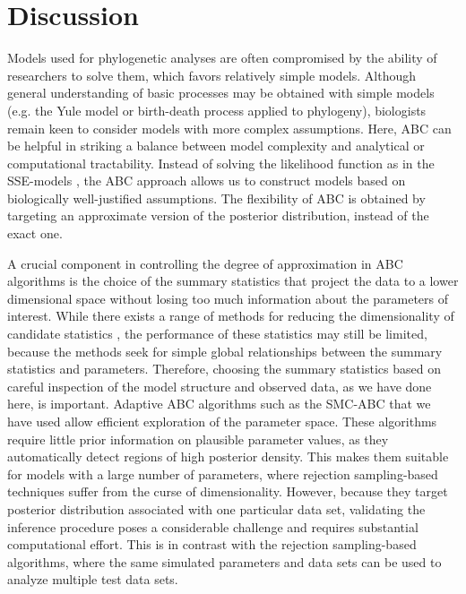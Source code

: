\section*{Discussion}
\noindent Models used for phylogenetic analyses are often compromised by the ability of researchers to solve them, which favors relatively simple models. 
Although general understanding of basic processes may be obtained with simple models (e.g. the Yule model \citep{Yule1924} or birth-death process applied to phylogeny), biologists remain keen to consider models with more complex assumptions. 
Here, ABC can be helpful in striking a balance between model complexity and analytical or computational tractability. 
Instead of solving the likelihood function as in the SSE-models \citep{Maddison2007, Goldberg2011, FitzJohn2012}, the ABC approach allows us to construct models based on biologically well-justified assumptions. 
The flexibility of ABC is obtained by targeting an approximate version of the posterior distribution, instead of the exact one. 

A crucial component in controlling the degree of approximation in ABC algorithms is the choice of the summary statistics that project the data to a lower dimensional space without losing too much information about the parameters of interest. 
While there exists a range of methods for reducing the dimensionality of candidate statistics \citep{Blum2013}, the performance of these statistics may still be limited, because the methods seek for simple global relationships between the summary statistics and parameters. 
Therefore, choosing the summary statistics based on careful inspection of the model structure and observed data, as we have done here, is important. 
Adaptive ABC algorithms such as the SMC-ABC that we have used allow efficient exploration of the parameter space. 
These algorithms require little prior information on plausible parameter values, as they automatically detect regions of high posterior density. 
This makes them suitable for models with a large number of parameters, where rejection sampling-based techniques suffer from the curse of dimensionality. 
However, because they target posterior distribution associated with one particular data set, validating the inference procedure poses a considerable challenge and requires substantial computational effort. 
This is in contrast with the rejection sampling-based algorithms, where the same simulated parameters and data sets can be used to analyze multiple test data sets. 

